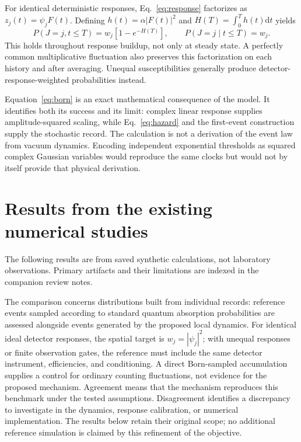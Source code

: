 \documentclass[11pt]{article}
\newcommand{\dd}{\mathrm d}
\begin{document}
For identical deterministic responses, Eq.~\eqref{eq:response} factorizes as $z_j(t)=\psi_j F(t)$. Defining $h(t)=\alpha|F(t)|^2$ and $H(T)=\int_0^T h(t)\dd t$ yields
\begin{equation}\label{eq:born}
 P(J=j,t\leq T)=w_j[1-e^{-H(T)}],\qquad
 P(J=j\mid t\leq T)=w_j.
\end{equation}
This holds throughout response buildup, not only at steady state. A perfectly common multiplicative fluctuation also preserves this factorization on each history and after averaging. Unequal susceptibilities generally produce detector-response-weighted probabilities instead.

Equation~\eqref{eq:born} is an exact mathematical consequence of the model. It identifies both its success and its limit: complex linear response supplies amplitude-squared scaling, while Eq.~\eqref{eq:hazard} and the first-event construction supply the stochastic record. The calculation is not a derivation of the event law from vacuum dynamics. Encoding independent exponential thresholds as squared complex Gaussian variables would reproduce the same clocks but would not by itself provide that physical derivation.

\section{Results from the existing numerical studies}
The following results are from saved synthetic calculations, not laboratory observations. Primary artifacts and their limitations are indexed in the companion review notes.

The comparison concerns distributions built from individual records: reference events sampled according to standard quantum absorption probabilities are assessed alongside events generated by the proposed local dynamics. For identical ideal detector responses, the spatial target is $w_j=|\psi_j|^2$; with unequal responses or finite observation gates, the reference must include the same detector instrument, efficiencies, and conditioning. A direct Born-sampled accumulation supplies a control for ordinary counting fluctuations, not evidence for the proposed mechanism. Agreement means that the mechanism reproduces this benchmark under the tested assumptions. Disagreement identifies a discrepancy to investigate in the dynamics, response calibration, or numerical implementation. The results below retain their original scope; no additional reference simulation is claimed by this refinement of the objective.
\end{document}

